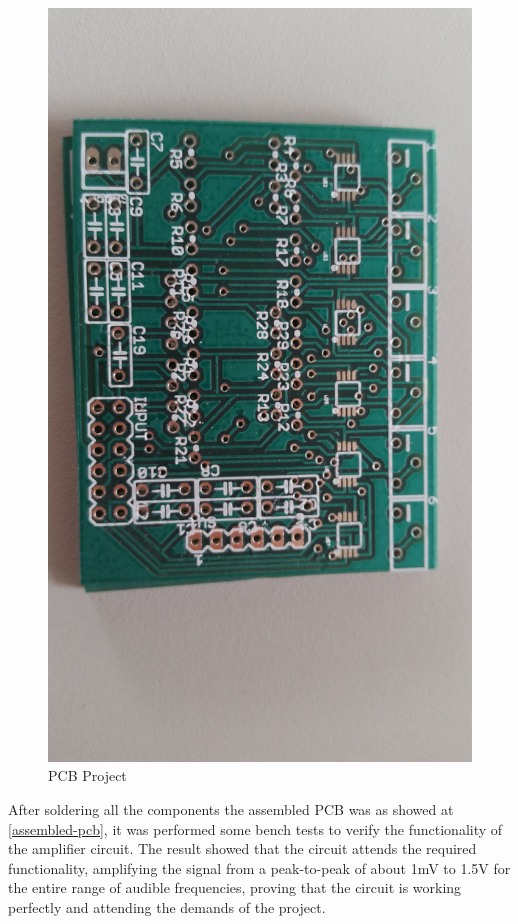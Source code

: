 \begin{figure}[!htpb]
  \centering
  \caption{PCB Project}
  \label{INA-printed}
  \includegraphics[scale=0.07]{images/INA/printed.jpeg}
\end{figure}


After soldering all the components the assembled PCB was as showed at \autoref{assembled-pcb},
it was performed some bench tests to verify the
functionality of the amplifier circuit. The result showed that the circuit attends
the required functionality, amplifying the signal from a peak-to-peak of about 1mV
to 1.5V for the entire range of audible frequencies, proving that the circuit is
working perfectly and attending the demands of the project.

